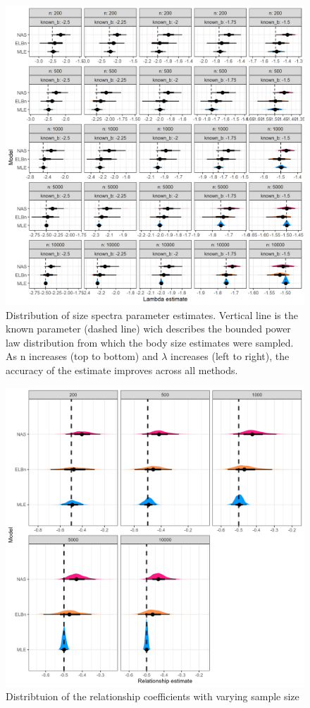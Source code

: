 \documentclass[
]{article}
\begin{document}
\begin{figure}
\centering
\includegraphics{figures/n_vary_est_b.png}
\caption{Distribution of size spectra parameter estimates. Vertical line
is the known parameter (dashed line) wich describes the bounded power
law distribution from which the body size estimates were sampled. As n
increases (top to bottom) and \(\lambda\) increases (left to right), the
accuracy of the estimate improves across all methods.}
\end{figure}

\newpage

\begin{figure}
\centering
\includegraphics{figures/n_vary_relationship_density.png}
\caption{Distribtuion of the relationship coefficients with varying
sample size}
\end{figure}
\end{document}
